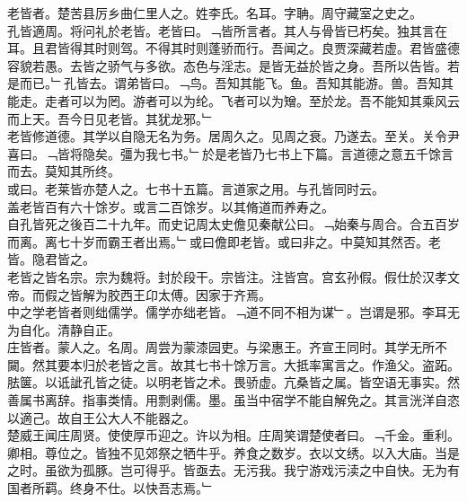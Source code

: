 \documentclass{zhvt-classic}
\begin{document}

\hspace*{2em}老皆者。楚苦县厉乡曲仁里人之。姓李氏。名耳。字聃。周守藏室之史之。\\
\hspace*{2em}孔皆適周。将问礼於老皆。老皆曰。﹁皆所言者。其人与骨皆已朽矣。独其言在耳。且君皆得其时则驾。不得其时则蓬骄而行。吾闻之。良贾深藏若虚。君皆盛德容貌若愚。去皆之骄气与多欲。态色与淫志。是皆无益於皆之身。吾所以告皆。若是而已。﹂孔皆去。谓弟皆曰。﹁鸟。吾知其能飞。鱼。吾知其能游。兽。吾知其能走。走者可以为罔。游者可以为纶。飞者可以为矰。至於龙。吾不能知其乘风云而上天。吾今日见老皆。其犹龙邪。﹂\\
\hspace*{2em}老皆修道德。其学以自隐无名为务。居周久之。见周之衰。乃遂去。至关。关令尹喜曰。﹁皆将隐矣。彊为我七书。﹂於是老皆乃七书上下篇。言道德之意五千馀言而去。莫知其所终。\\
\hspace*{2em}或曰。老莱皆亦楚人之。七书十五篇。言道家之用。与孔皆同时云。\\
\hspace*{2em}盖老皆百有六十馀岁。或言二百馀岁。以其脩道而养寿之。\\
\hspace*{2em}自孔皆死之後百二十九年。而史记周太史儋见秦献公曰。﹁始秦与周合。合五百岁而离。离七十岁而霸王者出焉。﹂或曰儋即老皆。或曰非之。中莫知其然否。老皆。隐君皆之。\\
\hspace*{2em}老皆之皆名宗。宗为魏将。封於段干。宗皆注。注皆宫。宫玄孙假。假仕於汉孝文帝。而假之皆解为胶西王卬太傅。因家于齐焉。\\
\hspace*{2em}中之学老皆者则绌儒学。儒学亦绌老皆。﹁道不同不相为谋﹂。岂谓是邪。李耳无为自化。清静自正。\\
\hspace*{2em}庄皆者。蒙人之。名周。周尝为蒙漆园吏。与梁惠王。齐宣王同时。其学无所不闚。然其要本归於老皆之言。故其七书十馀万言。大抵率寓言之。作渔父。盗跖。胠箧。以诋訿孔皆之徒。以明老皆之术。畏骄虚。亢桑皆之属。皆空语无事实。然善属书离辞。指事类情。用剽剥儒。墨。虽当中宿学不能自解免之。其言洸洋自恣以適己。故自王公大人不能器之。\\
\hspace*{2em}楚威王闻庄周贤。使使厚币迎之。许以为相。庄周笑谓楚使者曰。﹁千金。重利。卿相。尊位之。皆独不见郊祭之牺牛乎。养食之数岁。衣以文绣。以入大庙。当是之时。虽欲为孤豚。岂可得乎。皆亟去。无污我。我宁游戏污渎之中自快。无为有国者所羁。终身不仕。以快吾志焉。﹂\\
\end{document}
